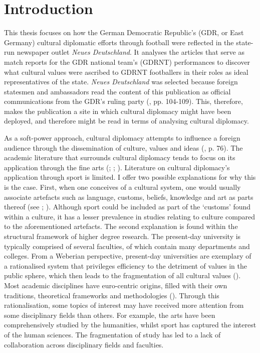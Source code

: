 \chapter*{Introduction}\label{cha:introduction}

This thesis focuses on how the German Democratic Republic’s (GDR, or East Germany) cultural diplomatic efforts through football were reflected in the state-run newspaper outlet \textit{Neues Deutschland}. It analyses the articles that serve as match reports for the GDR national team's (GDRNT) performances to discover what cultural values were ascribed to GDRNT footballers in their roles as ideal representatives of the state. \textit{Neues Deutschland} was selected because foreign statesmen and ambassadors read the content of this publication as official communications from the GDR’s ruling party (\cite{fiedler2014}, pp. 104-109). This, therefore, makes the publication a site in which cultural diplomacy might have been deployed, and therefore might be read in terms of analysing cultural diplomacy.

As a soft-power approach, cultural diplomacy attempts to influence a foreign audience through the dissemination of culture, values and ideas (\cite{lenczowski2009}, p. 76). The academic literature that surrounds cultural diplomacy tends to focus on its application through the fine arts (\cite{prevots1998}; \cite{david-fox2011}; \cite{mikkonensuutari2016}). Literature on cultural diplomacy’s application through sport is limited. I offer two possible explanations for why this is the case. First, when one conceives of a cultural system, one would usually associate artefacts such as language, customs, beliefs, knowledge and art as parts thereof (see \cite{boas1930}; \cite{tylor1958}). Although sport could be included as part of the ‘customs’ found within a culture, it has a lesser prevalence in studies relating to culture compared to the aforementioned artefacts. The second explanation is found within the structural framework of higher degree research. The present-day university is typically comprised of several faculties, of which contain many departments and colleges. From a Weberian perspective, present-day universities are exemplary of a rationalised system that privileges efficiency to the detriment of values in the public sphere, which then leads to the fragmentation of all cultural values (\cite{weber1976}). Most academic disciplines have euro-centric origins, filled with their own traditions, theoretical frameworks and methodologies (\cite{klein1990}). Through this rationalisation, some topics of interest may have received more attention from some disciplinary fields than others. For example, the arts have been comprehensively studied by the humanities, whilst sport has captured the interest of the human sciences. The fragmentation of study has led to a lack of collaboration across disciplinary fields and faculties.

